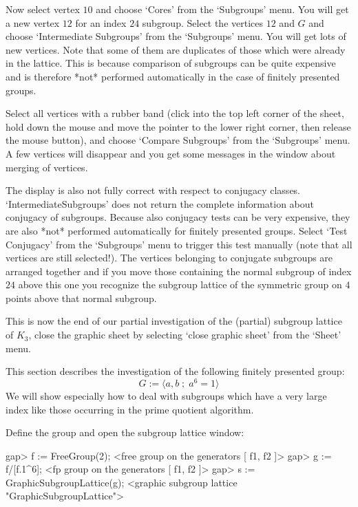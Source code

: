 Now select vertex $10$ and choose `Cores' from the `Subgroups' menu.
You will get a new vertex $12$ for  an index $24$ subgroup. Select the
vertices $12$   and $G$ and choose  `Intermediate  Subgroups' from the
`Subgroups' menu. You will get lots  of new vertices. Note that some
of them  are duplicates of  those which  were already  in the lattice. 
This is because comparison of subgroups can  be quite expensive and is
therefore   *not* performed automatically    in  the case of  finitely
presented groups.

Select all vertices with a rubber band (click into the top left corner
of  the sheet, hold down  the mouse and  move the pointer to the lower
right corner, then  release  the mouse  button), and   choose 
`Compare Subgroups' from the `Subgroups' menu.  A few vertices will disappear
and  you get  some  messages in  the {\GAP}  window   about merging of
vertices.

The  display   is also  not  fully correct  with  respect to conjugacy
classes.    `IntermediateSubgroups'    does  not  return  the complete
information about conjugacy of subgroups. Because also conjugacy tests
can be very expensive, they are also *not* performed automatically for
finitely   presented   groups.  Select    `Test  Conjugacy'  from  the
`Subgroups'  menu to  trigger  this  test  manually (note  that  all
vertices are still selected!).   The vertices belonging  to  conjugate
subgroups are  arranged together and  if you move those containing the
normal subgroup  of index $24$    above this  one you  recognize   the
subgroup lattice   of the symmetric  group on   $4$ points above  that
normal subgroup.

This is  now  the end  of our partial   investigation of the (partial)
subgroup lattice of $K_3$, close the graphic sheet by selecting `close
graphic sheet' from the `Sheet' menu.



This section describes the investigation of the following finitely presented
group: 
$$ G := \langle a, b \; ; \; a^6 = 1 \rangle $$
We will show especially how to deal with subgroups which have a very large
index like those occurring in the prime quotient algorithm.

Define the group and open the subgroup lattice window:

\begintt
gap> f := FreeGroup(2);
<free group on the generators [ f1, f2 ]>
gap> g := f/[f.1^6];
<fp group on the generators [ f1, f2 ]>
gap> s := GraphicSubgroupLattice(g);
<graphic subgroup lattice "GraphicSubgroupLattice">
\endtt

